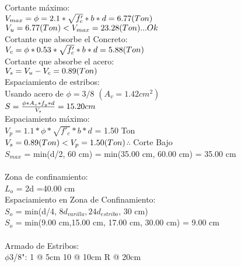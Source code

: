 \documentclass{article}%
\begin{document}
%
\normalsize%
Cortante máximo: \\$ V_{max} = \phi=2.1*\sqrt{f'_{c}}*b*d = 6.77(Ton) \\ $$ V_{u} = 6.77 (Ton) < V_{max} = 23.28 (Ton) ... Ok \\$\\ Cortante que absorbe el Concreto: \\$ V_{c}=\phi*0.53*\sqrt{f'_{c}}*b*d = 5.88(Ton) \\$\\Cortante que absorbe el acero:\\ $ V_{s} = V_{u} - V_{c} = 0.89(Ton) \\$\\ Espaciamiento de estribos: \\ Usando acero de $\phi = 3/8$  $(A_{v} = 1.42 cm^{2}) $\\$ S = \frac{\phi*A_{v}*f_{y}*d}{V_{s}} = 15.20 cm \\$\\ Espaciamiento máximo: \\$ V_p = 1.1*\phi*\sqrt{f'_{c}}*b*d $ = 1.50 Ton\\$ V_{s} = 0.89 (Ton) < V_{p} = 1.50 (Ton) \\$$\therefore$ Corte Bajo \\$ S_{max} $ = min(d/2, 60 cm) = min(35.00 cm, 60.00 cm) = 35.00 cm \\ \\ Zona de confinamiento: \\$L_{o}$ = 2d =40.00 cm \\Espaciamiento en Zona de Confinamiento: \\$S_{o}$ = min(d/4, $8d_{varilla}, 24d_{estribo}$, 30 cm) \\$S_{o}$ = min(9.00 cm,15.00 cm, 17.00 cm, 30.00 cm) = 9.00 cm \\ \\ Armado de Estribos: \\$\phi$3/8": 1 @ 5cm 10 @ 10cm R @ 20cm %
\end{document}
